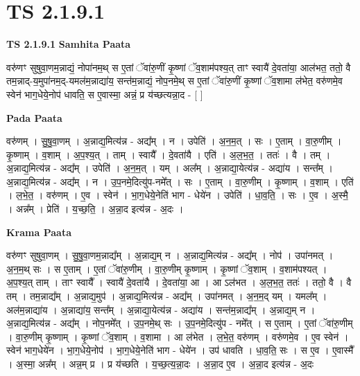 \documentclass[17pt]{extarticle}
\begin{document}
\section{ TS 2.1.9.1 }

\textbf{TS 2.1.9.1 } \newline
\textbf{Samhita Paata} \newline

वरु॑णꣳ सुषुवा॒णम॒न्नाद्यं॒ नोपा॑नम॒थ् स ए॒तां ॅवा॑रु॒णीं कृ॒ष्णां ॅव॒शाम॑पश्य॒त् ताꣳ स्वायै॑ दे॒वता॑या॒ आल॑भत॒ ततो॒ वै तम॒न्नाद्-य॒मुपा॑नम॒द्-यमल॑म॒न्नाद्या॑य॒ सन्त॑म॒न्नाद्यं॒ नोप॒नमे॒थ् स ए॒तां ॅवा॑रु॒णीं कृ॒ष्णां ॅव॒शामा ल॑भेत॒ वरु॑णमे॒व स्वेन॑ भाग॒धेये॒नोप॑ धावति॒ स ए॒वास्मा॒ अन्नं॒ प्र य॑च्छत्यन्ना॒द - [  ] \newline

\textbf{Pada Paata} \newline

वरु॑णम् । सु॒षु॒वा॒णम् । अ॒न्नाद्य॒मित्य॑न्न - अद्य᳚म् । न । उपेति॑ । अ॒न॒म॒त् । सः । ए॒ताम् । वा॒रु॒णीम् । कृ॒ष्णाम् । व॒शाम् । अ॒प॒श्य॒त् । ताम् । स्वायै᳚ । दे॒वता॑यै । एति॑ । अ॒ल॒भ॒त॒ । ततः॑ । वै । तम् । अ॒न्नाद्य॒मित्य॑न्न - अद्य᳚म् । उपेति॑ । अ॒न॒म॒त् । यम् । अल᳚म् । अ॒न्नाद्या॒येत्य॑न्न - अद्या॑य । सन्त᳚म् । अ॒न्नाद्य॒मित्य॑न्न - अद्य᳚म् । न । उ॒प॒नमे॒दित्यु॑प-नमे᳚त् । सः । ए॒ताम् । वा॒रु॒णीम् । कृ॒ष्णाम् । व॒शाम् । एति॑ । ल॒भे॒त॒ । वरु॑णम् । ए॒व । स्वेन॑ । भा॒ग॒धेये॒नेति॑ भाग - धेये॑न । उपेति॑ । धा॒व॒ति॒ । सः । ए॒व । अ॒स्मै॒ । अन्न᳚म् । प्रेति॑ । य॒च्छ॒ति॒ । अ॒न्ना॒द इत्य॑न्न - अ॒दः ।  \newline


\textbf{Krama Paata} \newline

वरु॑णꣳ सुषुवा॒णम् । सु॒षु॒वा॒णम॒न्नाद्य᳚म् । अ॒न्नाद्य॒म् न । अ॒न्नाद्य॒मित्य॑न्न - अद्य᳚म् । नोप॑ । उपा॑नमत् । अ॒न॒म॒थ् सः । स ए॒ताम् । ए॒तां ॅवा॑रु॒णीम् । वा॒रु॒णीम् कृ॒ष्णाम् । कृ॒ष्णां ॅव॒शाम् । व॒शाम॑पश्यत् । अ॒प॒श्य॒त् ताम् । ताꣳ स्वायै᳚ । स्वायै॑ दे॒वता॑यै । दे॒वता॑या॒ आ । आ ऽल॑भत । अ॒ल॒भ॒त॒ ततः॑ । ततो॒ वै । वै तम् । तम॒न्नाद्य᳚म् । अ॒न्नाद्य॒मुप॑ । अ॒न्नाद्य॒मित्य॑न्न - अद्य᳚म् । उपा॑नमत् । अ॒न॒म॒द् यम् । यमल᳚म् । अल॑म॒न्नाद्या॑य । अ॒न्नाद्या॑य॒ सन्त᳚म् । अ॒न्नाद्या॒येत्य॑न्न - अद्या॑य । सन्त॑म॒न्नाद्य᳚म् । अ॒न्नाद्य॒म् न । अ॒न्नाद्य॒मित्य॑न्न - अद्य᳚म् । नोप॒नमे᳚त् । उ॒प॒नमे॒थ् सः । उ॒प॒नमे॒दित्यु॑प - नमे᳚त् । स ए॒ताम् । ए॒तां ॅवा॑रु॒णीम् । वा॒रु॒णीम् कृ॒ष्णाम् । कृ॒ष्णां ॅव॒शाम् । व॒शामा । आ ल॑भेत । ल॒भे॒त॒ वरु॑णम् । वरु॑णमे॒व । ए॒व स्वेन॑ । स्वेन॑ भाग॒धेये॑न । भा॒ग॒धेये॒नोप॑ । भा॒ग॒धेये॒नेति॑ भाग - धेये॑न । उप॑ धावति । धा॒व॒ति॒ सः । स ए॒व । ए॒वास्मै᳚ । अ॒स्मा॒ अन्न᳚म् । अन्न॒म् प्र । प्र य॑च्छति । य॒च्छ॒त्य॒न्ना॒दः । अ॒न्ना॒द ए॒व । अ॒न्ना॒द इत्य॑न्न - अ॒दः \newline
\end{document}
